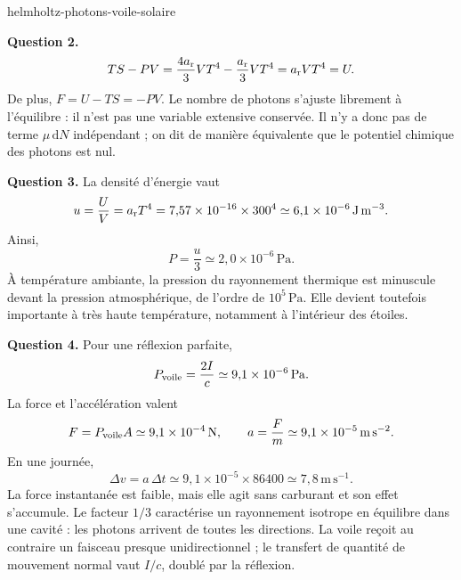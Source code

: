 \begin{exo}{helmholtz-photons-voile-solaire}
\begin{solution}
\textbf{Question 2.}
\[
TS-PV=\frac{4a_{\rm r}}{3}VT^4-\frac{a_{\rm r}}{3}VT^4
=a_{\rm r}VT^4=U.
\]
De plus, $F=U-TS=-PV$. Le nombre de photons s'ajuste librement à l'équilibre : il n'est pas une variable extensive conservée. Il n'y a donc pas de terme $\mu\,\mathrm dN$ indépendant ; on dit de manière équivalente que le potentiel chimique des photons est nul.

\textbf{Question 3.} La densité d'énergie vaut
\[
u=\frac UV=a_{\rm r}T^4
=7{,}57\times10^{-16}\times300^4
\simeq6{,}1\times10^{-6}\,\mathrm{J\,m^{-3}}.
\]
Ainsi,
\[
P=\frac u3\simeq2{,}0\times10^{-6}\,\mathrm{Pa}.
\]
À température ambiante, la pression du rayonnement thermique est minuscule devant la pression atmosphérique, de l'ordre de $10^5\,\mathrm{Pa}$. Elle devient toutefois importante à très haute température, notamment à l'intérieur des étoiles.

\textbf{Question 4.} Pour une réflexion parfaite,
\[
P_{\rm voile}=\frac{2I}{c}
\simeq9{,}1\times10^{-6}\,\mathrm{Pa}.
\]
La force et l'accélération valent
\[
F=P_{\rm voile}A\simeq9{,}1\times10^{-4}\,\mathrm N,
\qquad
a=\frac Fm\simeq9{,}1\times10^{-5}\,\mathrm{m\,s^{-2}}.
\]
En une journée,
\[
\Delta v=a\,\Delta t
\simeq9{,}1\times10^{-5}\times86400
\simeq7{,}8\,\mathrm{m\,s^{-1}}.
\]
La force instantanée est faible, mais elle agit sans carburant et son effet s'accumule. Le facteur $1/3$ caractérise un rayonnement isotrope en équilibre dans une cavité : les photons arrivent de toutes les directions. La voile reçoit au contraire un faisceau presque unidirectionnel ; le transfert de quantité de mouvement normal vaut $I/c$, doublé par la réflexion.
\end{solution}
\end{exo}

